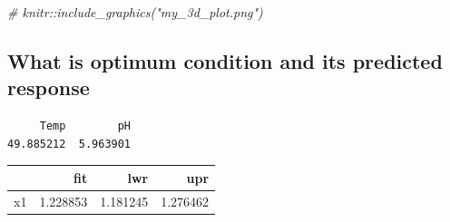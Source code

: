 \documentclass[
  12pt,
]{article}
\newenvironment{Shaded}{\begin{snugshade}}{\end{snugshade}}
\newcommand{\AttributeTok}[1]{\textcolor[rgb]{0.13,0.29,0.53}{#1}}
\newcommand{\CommentTok}[1]{\textcolor[rgb]{0.56,0.35,0.01}{\textit{#1}}}
\newcommand{\DecValTok}[1]{\textcolor[rgb]{0.00,0.00,0.81}{#1}}
\newcommand{\FunctionTok}[1]{\textcolor[rgb]{0.13,0.29,0.53}{\textbf{#1}}}
\newcommand{\NormalTok}[1]{#1}
\newcommand{\OtherTok}[1]{\textcolor[rgb]{0.56,0.35,0.01}{#1}}
\newcommand{\SpecialCharTok}[1]{\textcolor[rgb]{0.81,0.36,0.00}{\textbf{#1}}}
\newcommand{\StringTok}[1]{\textcolor[rgb]{0.31,0.60,0.02}{#1}}
\newcounter{none} %
\begin{document}
\begin{Shaded}
\begin{Highlighting}[]
\CommentTok{\# knitr::include\_graphics("my\_3d\_plot.png")}
\end{Highlighting}
\end{Shaded}

\subsection{What is optimum condition and its predicted
response}\label{what-is-optimum-condition-and-its-predicted-response}

\begin{Shaded}
\end{Shaded}

\begin{verbatim}
     Temp        pH 
49.885212  5.963901 
\end{verbatim}

\begin{Shaded}
\end{Shaded}

{\def\LTcaptype{none} %
\begin{longtable}[]{@{}lrrr@{}}
\toprule\noalign{}
& fit & lwr & upr \\
\midrule\noalign{}
\endhead
\bottomrule\noalign{}
\endlastfoot
x1 & 1.228853 & 1.181245 & 1.276462 \\
\end{longtable}
}
\end{document}
